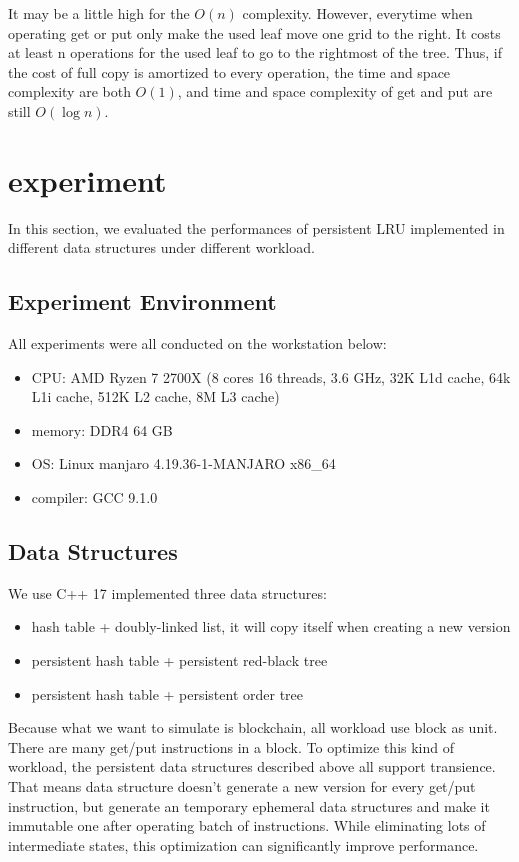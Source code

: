 \documentclass[conference]{IEEEtran}
\begin{document}
It may be a little high for the $O(n)$ complexity.
However, everytime when operating get or put only
make the used leaf move one grid to the right.
It costs  at least n operations for the used leaf
to go to the rightmost of the tree. Thus, if the
cost of full copy is amortized to every operation,
the time and space complexity are both $O(1)$,
and time and space complexity of get and put are still $O(\log n)$.

\section{experiment}
In this section, we evaluated the performances of 
persistent LRU implemented in different data 
structures under different workload.

\subsection{Experiment Environment}
All experiments were all conducted on the workstation below:

\begin{itemize}
\item CPU: AMD Ryzen 7 2700X (8 cores 16 threads, 3.6 GHz, 32K L1d cache, 64k L1i cache, 512K L2 cache, 8M L3 cache)
\item memory: DDR4 64 GB
\item OS: Linux manjaro 4.19.36-1-MANJARO x86\_64
\item compiler: GCC 9.1.0
\end{itemize}

\subsection{Data Structures}

We use C++ 17 implemented three data structures:

\begin{itemize}
\item hash table + doubly-linked list, it will copy itself when creating a new version
\item persistent hash table + persistent red-black tree
\item persistent hash table + persistent order tree
\end{itemize}

Because what we want to simulate is blockchain,
all workload use block as unit.
There are many get/put instructions in a block.
To optimize this kind of workload,
the persistent data structures described above all
support transience. That means data structure doesn't 
generate a new version for every get/put instruction,
but generate an temporary ephemeral data structures and
make it immutable one after operating batch of instructions.
While eliminating lots of intermediate states,
this optimization can significantly improve performance.
\end{document}

